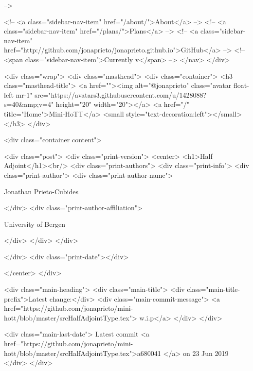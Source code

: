       
     -->

    <!-- <a class="sidebar-nav-item" href="/about/">About</a> -->
    <!-- <a class="sidebar-nav-item" href="/plans/">Plans</a> -->
    <!-- <a class="sidebar-nav-item" href="http://github.com/jonaprieto/jonaprieto.github.io">GitHub</a> -->
    <!-- <span class="sidebar-nav-item">Currently v</span> -->
  </nav>
</div>

    <div class="wrap">
      <div class="masthead">
        <div class="container">
          <h3 class="masthead-title">
            <a href=""><img alt="@jonaprieto" class="avatar float-left mr-1" src="https://avatars3.githubusercontent.com/u/1428088?s=40&amp;v=4" height="20" width="20"></a>
            <a href="/" title="Home">Mini-HoTT</a>
            <small style="text-decoration:left"></small>
          </h3>
        </div>
      
      <div class="container content">
        







<div class="post">
  <div class="print-version">
    <center>
      <h1>Half Adjoint</h1><br/>
        <div class="print-authors">
          <div class="print-info">
            <div class="print-author">
              <div class="print-author-name">
                
                  Jonathan Prieto-Cubides
                
              </div>
              <div class="print-author-affiliation">
                
                  University of Bergen
                
                </div>
            </div>
          </div>
          
          
        </div>
        <div class="print-date"></div>
        
        
    </center>
  </div>

  
  <div class="main-heading">
    <div class="main-title">
      <div class="main-title-prefix">Latest change:</div>
      <div class="main-commit-message">
            <a href="https://github.com/jonaprieto/mini-hott/blob/master/srcHalfAdjointType.tex">
              w.i.p</a>
      </div>
    </div>

    <div class="main-last-date">
      Latest commit <a href="https://github.com/jonaprieto/mini-hott/blob/master/srcHalfAdjointType.tex">a680041 </a> on  23 Jun 2019
    </div>
  </div>
  

